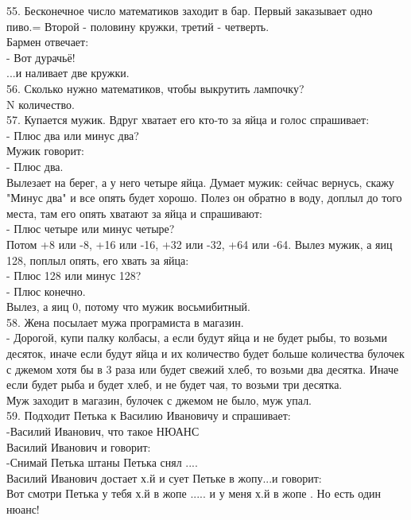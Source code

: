 \documentclass[a4paper,20pt,notitlepage]{extbook}
\begin{document}
	55. Бесконечное число математиков заходит в	бар. Первый заказывает одно пиво.=
	Второй - половину кружки, третий -	четверть.\\
	Бармен отвечает:\\
	- Вот дурачьё!\\
	...и наливает две кружки.\\
	
	56. Сколько нужно математиков, чтобы выкрутить лампочку?\\
		N количество. \\
		
	57. Купается мужик. Вдруг хватает его кто-то за яйца и голос спрашивает:\\
	- Плюс два или минус два?\\
	Мужик говорит:\\
	- Плюс два.\\
	Вылезает на берег, а у него четыре яйца. Думает мужик: сейчас вернусь, скажу "Минус два" и все опять будет хорошо. Полез он обратно в воду, доплыл до того места, там его опять хватают за яйца и спрашивают:\\
	- Плюс четыре или минус четыре?\\
	Потом +8 или -8, +16 или -16, +32 или -32, +64 или -64. Вылез мужик, а яиц 128, поплыл опять, его хвать за яйца:\\
	- Плюс 128 или минус 128?\\
	- Плюс конечно.\\
	Вылез, а яиц 0, потому что мужик восьмибитный.\\
	
	58. Жена посылает мужа програмиста в магазин.\\
	- Дорогой, купи палку колбасы, а если будут яйца и не будет рыбы, то возьми десяток, иначе если будут яйца и их количество будет больше количества булочек с джемом хотя бы в 3 раза или будет свежий хлеб, то возьми два десятка. Иначе если будет рыба и будет хлеб, и не будет чая, то возьми три десятка.\\
	Муж заходит в магазин, булочек с джемом не было, муж упал.\\
	
	59. Подходит Петька к Василию Ивановичу и спрашивает:\\
	-Василий Иванович, что такое НЮАНС\\
	Василий Иванович и говорит:\\
	-Снимай Петька штаны
	Петька снял ....\\
	Василий Иванович достает х.й и сует Петьке в жопу...и говорит:\\ 
	Вот смотри Петька у тебя х.й в жопе ..... и у меня х.й в жопе . Но есть один нюанс!\\
	
\end{document}
